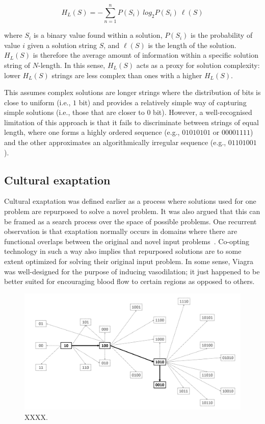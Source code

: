 \documentclass{article}
\begin{document}
\begin{equation}
H_{L}(S) = -\sum_{n=1}^{n} P(S_i) \ log_2 P(S_i) \ \ell(S)
\end{equation}

where $S_i$ is a binary value found within a solution, $P(S_i)$ is the probability of value $i$ given a solution string $S$, and $\ell(S)$ is the length of the solution. $H_{L}(S)$ is therefore the average amount of information within a specific solution string of $N$-length. In this sense, $H_{L}(S)$ acts as a proxy for solution complexity: lower $H_{L}(S)$ strings are less complex than ones with a higher $H_{L}(S)$. 

This assumes complex solutions are longer strings where the distribution of bits is close to uniform (i.e., $1$ bit) and provides a relatively simple way of capturing simple solutions (i.e., those that are closer to $0$ bit). However, a well-recognised limitation of this approach is that it fails to discriminate between strings of equal length, where one forms a highly ordered sequence (e.g., $01010101$ or $00001111$) and the other approximates an algorithmically irregular sequence (e.g., $01101001$).

\subsection{Cultural exaptation}
Cultural exaptation was defined earlier as a process where solutions used for one problem are repurposed to solve a novel problem. It was also argued that this can be framed as a search process over the space of possible problems. One recurrent observation is that exaptation normally occurs in domains where there are functional overlaps between the original and novel input problems~\cite{arthur2009nature,mastrogiorgio2016innovation}. Co-opting technology in such a way also implies that repurposed solutions are to some extent optimized for solving their original input problem. In some sense, Viagra was well-designed for the purpose of inducing vasodilation; it just happened to be better suited for encouraging blood flow to certain regions as opposed to others.

\begin{figure}[H]
\begin{center}
    \includegraphics[width=\linewidth]{probspace.png}
\end{center}
    \caption{XXXX.}
    \label{fig:topology}
\end{figure}
\end{document}
